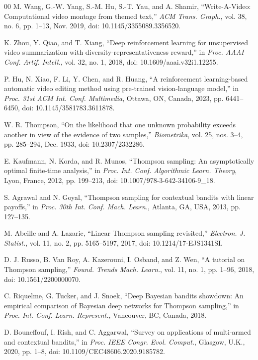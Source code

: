 \documentclass{ieeeaccess}
\begin{document}
\begin{thebibliography}{00}
 M. Wang, G.-W. Yang, S.-M. Hu, S.-T. Yau, and A. Shamir, ``Write-A-Video: Computational video montage from themed text,'' \emph{ACM Trans. Graph.}, vol. 38, no. 6, pp. 1--13, Nov. 2019, doi: 10.1145/3355089.3356520.

 K. Zhou, Y. Qiao, and T. Xiang, ``Deep reinforcement learning for unsupervised video summarization with diversity-representativeness reward,'' in \emph{Proc. AAAI Conf. Artif. Intell.}, vol. 32, no. 1, 2018, doi: 10.1609/aaai.v32i1.12255.

 P. Hu, N. Xiao, F. Li, Y. Chen, and R. Huang, ``A reinforcement learning-based automatic video editing method using pre-trained vision-language model,'' in \emph{Proc. 31st ACM Int. Conf. Multimedia}, Ottawa, ON, Canada, 2023, pp. 6441--6450, doi: 10.1145/3581783.3611878.

 W. R. Thompson, ``On the likelihood that one unknown probability exceeds another in view of the evidence of two samples,'' \emph{Biometrika}, vol. 25, nos. 3--4, pp. 285--294, Dec. 1933, doi: 10.2307/2332286.

 E. Kaufmann, N. Korda, and R. Munos, ``Thompson sampling: An asymptotically optimal finite-time analysis,'' in \emph{Proc. Int. Conf. Algorithmic Learn. Theory}, Lyon, France, 2012, pp. 199--213, doi: 10.1007/978-3-642-34106-9\_18.

 S. Agrawal and N. Goyal, ``Thompson sampling for contextual bandits with linear payoffs,'' in \emph{Proc. 30th Int. Conf. Mach. Learn.}, Atlanta, GA, USA, 2013, pp. 127--135.

 M. Abeille and A. Lazaric, ``Linear Thompson sampling revisited,'' \emph{Electron. J. Statist.}, vol. 11, no. 2, pp. 5165--5197, 2017, doi: 10.1214/17-EJS1341SI.

 D. J. Russo, B. Van Roy, A. Kazerouni, I. Osband, and Z. Wen, ``A tutorial on Thompson sampling,'' \emph{Found. Trends Mach. Learn.}, vol. 11, no. 1, pp. 1--96, 2018, doi: 10.1561/2200000070.

 C. Riquelme, G. Tucker, and J. Snoek, ``Deep Bayesian bandits showdown: An empirical comparison of Bayesian deep networks for Thompson sampling,'' in \emph{Proc. Int. Conf. Learn. Represent.}, Vancouver, BC, Canada, 2018.

 D. Bouneffouf, I. Rish, and C. Aggarwal, ``Survey on applications of multi-armed and contextual bandits,'' in \emph{Proc. IEEE Congr. Evol. Comput.}, Glasgow, U.K., 2020, pp. 1--8, doi: 10.1109/CEC48606.2020.9185782.


\end{thebibliography}
\end{document}

